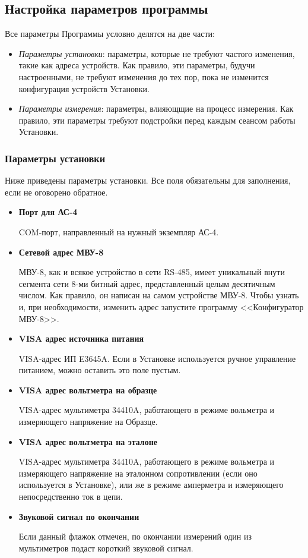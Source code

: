 \documentclass[12pt, a4paper, twocolumn]{report}
\newcommand{\PARAM}[1]{\item {\bf #1} }
\begin{document}
\subsection{Настройка параметров программы}

Все параметры Программы условно делятся на две части:

\begin{itemize}

\item \emph{Параметры установки}: параметры, которые не требуют частого изменения, такие как адреса устройств. Как правило, эти параметры, будучи настроенными, не требуют изменения до тех пор, пока не изменится конфигурация устройств Установки.

\item \emph{Параметры измерения}: параметры, влияющщие на процесс измерения. Как правило, эти параметры требуют подстройки перед каждым сеансом работы Установки.

\end{itemize}

\subsubsection{Параметры установки}

Ниже приведены параметры установки. Все поля обязательны для заполнения, если не оговорено обратное.

\begin{itemize}

\PARAM{Порт для АС-4}

COM-порт, направленный на нужный экземпляр АС-4. 

\PARAM{Сетевой адрес МВУ-8}

МВУ-8, как и всякое устройство в сети RS-485, имеет уникальный внути сегмента сети 8-ми битный адрес, представленный целым десятичным числом. Как правило, он написан на самом устройстве МВУ-8. Чтобы узнать и, при необходимости, изменить адрес запустите программу <<Конфигуратор МВУ-8>>.

\PARAM{VISA адрес источника питания}

VISA-адрес ИП E3645A. Если в Установке используется ручное управление питанием, можно оставить это поле пустым.

\PARAM{VISA адрес вольтметра на образце}

VISA-адрес мультиметра 34410A, работающего в режиме вольметра и измеряющего напряжение на Образце.

\PARAM{VISA адрес вольтметра на эталоне}

VISA-адрес мультиметра 34410A, работающего в режиме вольметра и измеряющего напряжение на эталонном сопротивлении (если оно используется в Установке), или же в режиме амперметра и измеряющего непосредственно ток в цепи.

\PARAM{Звуковой сигнал по окончании}

Если данный флажок отмечен, по окончании измерений один из мультиметров подаст короткий звуковой сигнал.

\end{itemize}
\end{document}
